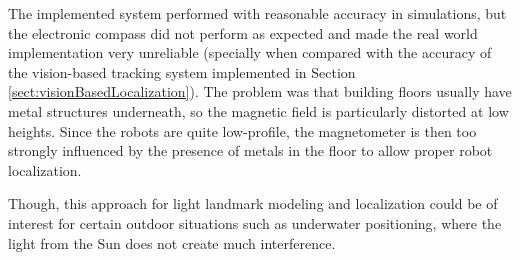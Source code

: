 The implemented system performed with reasonable accuracy in simulations, but the electronic compass did not perform as expected and made the real world implementation very unreliable (specially when compared with the accuracy of the vision-based tracking system implemented in Section \ref{sect:visionBasedLocalization}).
The problem was that building floors usually have metal structures underneath, so the magnetic field is particularly distorted at low heights. Since the robots are quite low-profile, the magnetometer is then too strongly influenced by the presence of metals in the floor to allow proper robot localization.

Though, this approach for light landmark modeling and localization could be of interest for certain outdoor situations such as underwater positioning, where the light from the Sun does not create much interference.


\newpage \thispagestyle{empty} %



\fancyfoot[CE,CO]{\leftmark}

